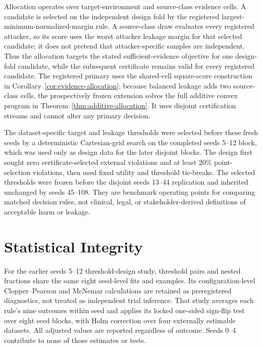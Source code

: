 Allocation operates over target-environment and source-class evidence cells.
A candidate is selected on the independent design fold by the registered
largest-minimum-normalized-margin rule. A source-class draw evaluates every
registered attacker, so its score uses the worst attacker leakage margin for
that selected candidate; it does not pretend that attacker-specific samples are
independent. Thus the allocation targets the stated sufficient-evidence
objective for one design-fold candidate, while the subsequent certificate
remains valid for every registered candidate. The registered primary uses the
shared-cell square-score construction in
Corollary~\ref{cor:evidence-allocation}; because balanced leakage adds two
source-class cells, the prospectively frozen extension solves the full additive convex
program in Theorem~\ref{thm:additive-allocation}. It uses disjoint certification
streams and cannot alter any primary decision.

The dataset-specific target and leakage thresholds were selected before these
fresh seeds by a deterministic Cartesian-grid search on the completed seeds
5--12 block, which was used only as design data for the later disjoint blocks.
The design first sought zero certificate-selected external violations
and at least 20\% point-selection violations, then used fixed utility and
threshold tie-breaks. The selected thresholds were frozen before the disjoint
seeds 13--44 replication and inherited unchanged by seeds 45--108. They are
benchmark operating points for comparing matched decision rules, not clinical,
legal, or stakeholder-derived definitions of acceptable harm or leakage.

\section{Statistical Integrity}

For the earlier seeds 5--12 threshold-design study, threshold pairs and nested
fractions share the same eight seed-level fits and examples. Its
configuration-level Clopper--Pearson and McNemar calculations are retained as
preregistered diagnostics, not treated as independent trial inference. That
study averages each rule's nine outcomes within seed and applies its locked
one-sided sign-flip test over eight seed blocks, with Holm correction over four
externally estimable datasets. All adjusted values are reported regardless of
outcome. Seeds 0--4 contribute to none of those estimates or tests.

